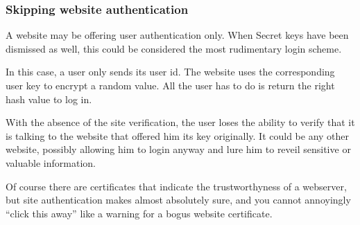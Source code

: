 \subsubsection{Skipping website authentication}
A website may be offering user authentication only.
When Secret keys have been dismissed as well,
this could be considered the most rudimentary login scheme.
\par
In this case,
a user only sends its user id.
The website uses the corresponding user key to encrypt a random value.
All the user has to do is return the right hash value to log in.
\par
With the absence of the site verification,
the user loses the ability to verify that it is talking to the website that offered him its key originally.
It could be any other website,
possibly allowing him to login anyway and lure him to reveil sensitive or valuable information.
\par
Of course there are certificates that indicate the trustworthyness of a webserver,
but site authentication makes almost absolutely sure,
and you cannot annoyingly ``click this away'' like a warning for a bogus website certificate.
